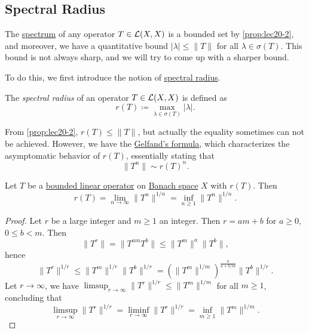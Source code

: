 \subsection{Spectral Radius}
The \hyperref[def:spectrum-point]{spectrum} of any operator \(T\in \mathcal{\MakeUppercase{l}} (X, X)\) is a bounded set by \autoref{prop:lec20-2}, and moreover, we have a quantitative bound \(\vert \lambda  \vert \leq \lVert T \rVert  \) for all \(\lambda \in \sigma (T)\). This bound is not always sharp, and we will try to come up with a sharper bound.

To do this, we first introduce the notion of \hyperref[def:spectral-radius]{spectral radius}.

\begin{definition}\label{def:spectral-radius}
	The \emph{spectral radius} of an operator \(T\in \mathcal{\MakeUppercase{l}} (X, X)\) is defined as
	\[
		r(T) \coloneqq \max _{\lambda\in \sigma (T) }\vert \lambda \vert .
	\]
\end{definition}

From \autoref{prop:lec20-2}, \(r(T) \leq \lVert T \rVert \), but actually the equality sometimes can not be achieved. However, we have the \hyperref[thm:Gelfand-formula]{Gelfand's formula}, which characterizes the asymptomatic behavior of \(r(T)\), essentially stating that
\[
	\lVert T^n \rVert \sim r(T)^n.
\]

\begin{theorem}\label{thm:Gelfand-formula}
	Let \(T\) be a \hyperref[def:bounded-linear-op]{bounded linear operator} on \hyperref[def:Banach-space]{Banach space} \(X\) with \(r(T)\). Then
	\[
		r(T) = \lim_{n \to \infty} \lVert T^n \rVert ^{1 / n} = \inf _{n\geq 1}\lVert T^n \rVert ^{1 / n}.
	\]
\end{theorem}
\begin{proof}\let\qed\relax
	Let \(r\) be a large integer and \(m\geq 1\) an integer. Then \(r = am+b\) for \(a \geq 0\), \(0 \leq b < m\). Then
	\[
		\lVert T^r \rVert
		= \lVert T^{am} T^b\rVert
		\leq \lVert T^m \rVert ^a \lVert T^b \rVert,
	\]
	hence
	\[
		\lVert T^r \rVert ^{1 / r}
		\leq \lVert T^m \rVert ^{1 / r} \lVert T^b \rVert ^{1 / r}
		= \left( \lVert T^m \rVert ^{1 / m} \right) ^{\frac{a}{a+ b / m}} \lVert T^b \rVert ^{1 / r}.
	\]
	Let \(r \to \infty \), we have \(\limsup_{r \to \infty} \lVert T^r \rVert ^{1 / r} \leq \lVert T^m \rVert ^{1 / m}\) for all \(m \geq 1\), concluding that
	\[
		\limsup_{r \to \infty} \lVert T^r \rVert ^{1 / r}
		= \liminf_{r \to \infty} \lVert T^r \rVert ^{1 / r}
		= \inf _{m\geq 1}\lVert T^m \rVert ^{1 / m}.
	\]
\end{proof}